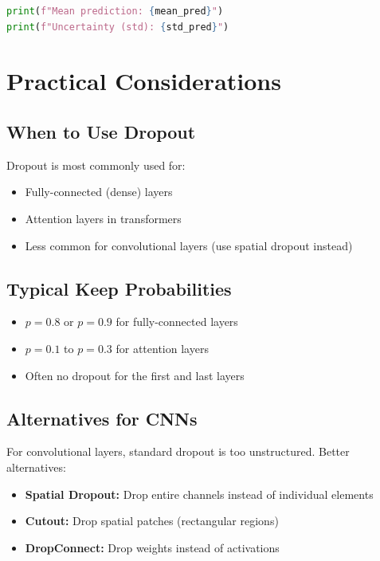 \begin{notechapter}
\begin{lstlisting}[language=Python]
print(f"Mean prediction: {mean_pred}")
print(f"Uncertainty (std): {std_pred}")
\end{lstlisting}

\section{Practical Considerations}

\subsection{When to Use Dropout}

Dropout is most commonly used for:
\begin{itemize}
    \item Fully-connected (dense) layers
    \item Attention layers in transformers
    \item Less common for convolutional layers (use spatial dropout instead)
\end{itemize}

\subsection{Typical Keep Probabilities}

\begin{itemize}
    \item $p = 0.8$ or $p = 0.9$ for fully-connected layers
    \item $p = 0.1$ to $p = 0.3$ for attention layers
    \item Often no dropout for the first and last layers
\end{itemize}

\subsection{Alternatives for CNNs}

For convolutional layers, standard dropout is too unstructured. Better alternatives:

\begin{itemize}
    \item \textbf{Spatial Dropout:} Drop entire channels instead of individual elements
    \item \textbf{Cutout:} Drop spatial patches (rectangular regions)
    \item \textbf{DropConnect:} Drop weights instead of activations
\end{itemize}


\end{notechapter}
